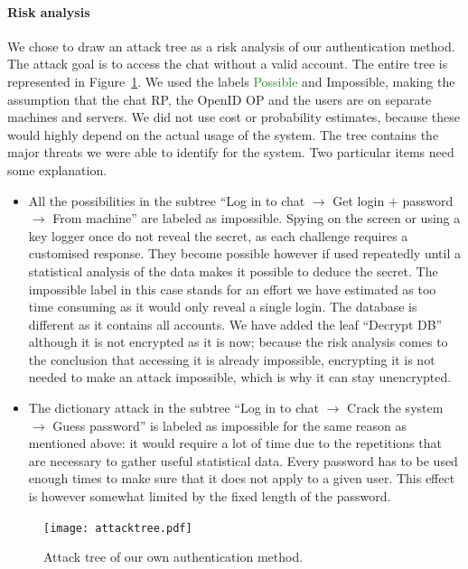 \documentclass[11pt,a4paper]{article}
\begin{document}
\paragraph{Risk analysis} We chose to draw an attack tree as a risk analysis of our authentication method. The attack goal is to access the chat without a valid account. The entire tree is represented in Figure~\ref{fig:attacktree}.
We used the labels \textcolor{ForestGreen}{Possible} and \textcolor{BrickRed}{Impossible}, making the assumption that the chat RP, the OpenID OP and the users are on separate machines and servers. We did not use cost or probability estimates, because these would highly depend on the actual usage of the system.
The tree contains the major threats we were able to identify for the system. Two particular items need some explanation.
\begin{itemize}
\item All the possibilities in the subtree ``Log in to chat $\rightarrow$ Get login $+$ password $\rightarrow$ From machine'' are labeled as impossible. Spying on the screen or using a key logger once do not reveal the secret, as each challenge requires a customised response. They become possible however if used repeatedly until a statistical analysis of the data makes it possible to deduce the secret. The impossible label in this case stands for an effort we have estimated as too time consuming as it would only reveal a single login. The database is different as it contains all accounts. We have added the leaf ``Decrypt DB'' although it is not encrypted as it is now; because the risk analysis comes to the conclusion that accessing it is already impossible, encrypting it is not needed to make an attack impossible, which is why it can stay unencrypted.
\item The dictionary attack in the subtree ``Log in to chat $\rightarrow$ Crack the system $\rightarrow$ Guess password'' is labeled as impossible for the same reason as mentioned above: it would require a lot of time due to the repetitions that are necessary to gather useful statistical data. Every password has to be used enough times to make sure that it does not apply to a given user. This effect is however somewhat limited by the fixed length of the password.
\end{itemize}
\begin{figure}
\centering
\texttt{[image: attacktree.pdf]}
\caption{Attack tree of our own authentication method.}
\label{fig:attacktree}
\end{figure}
\end{document}
